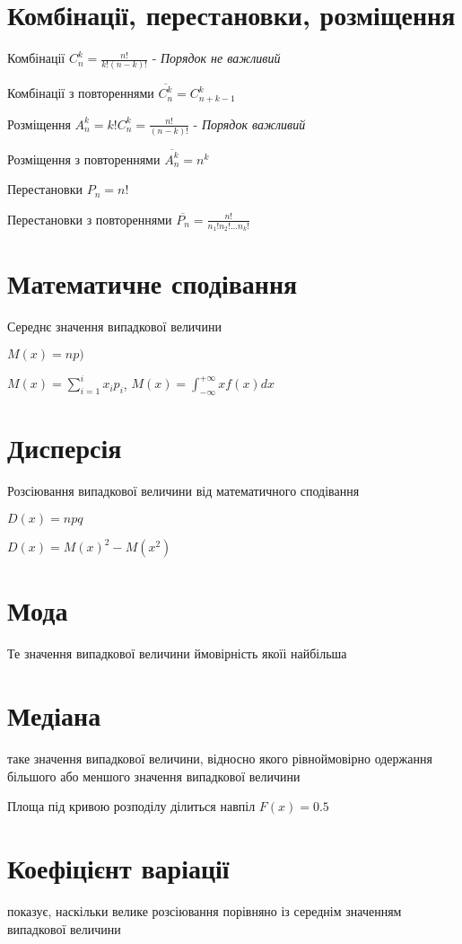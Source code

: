 \documentclass{article}
\begin{document}
\begin{Large}
\section*{Комбінації, перестановки, розміщення}
\begin{list}{-}{}
	\item Комбінації $C_n^k=\frac{n!}{k!(n-k)!}$ - \textit{Порядок не важливий}
	\item Комбінації з повтореннями $\overline{C_n^k}=C_{n+k-1}^k$
	\item Розміщення $A_n^k=k!C_n^k=\frac{n!}{(n-k)!}$ - \textit{Порядок важливий}
	\item Розміщення з повтореннями $\overline{A_n^k}=n^k$
	\item Перестановки $P_n=n!$
	\item Перестановки з повтореннями $\overline{P_n}=\frac{n!}{n_1!n_2!...n_k!}$
\end{list}

\section*{Математичне сподівання}
Середнє значення випадкової величини

$M(x)=np)$

$M(x)=\sum_{i=1}^{i}x_ip_i$, $M(x)=\int_{-\infty}^{+\infty}xf(x)dx$
\section*{Дисперсія}
Розсіювання випадкової величини від математичного сподівання

$D(x)=npq$

$D(x)=M(x)^2-M(x^2)$

\section*{Мода}
Те значення випадкової величини ймовірність якоїі найбільша

\section*{Медіана}
таке значення випадкової величини, відносно якого рівноймовірно одержання більшого або меншого значення випадкової величини

Площа під кривою розподілу ділиться навпіл $F(x)=0.5$

\section*{Коефіцієнт варіації}
показує, наскільки велике розсіювання порівняно із середнім значенням випадкової величини


\end{Large}
\end{document}
